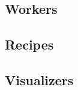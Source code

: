 \documentclass[a4paper]{article}
\begin{document}
\subsection{Workers}
\label{sec:data_processing_workers}

\subsection{Recipes}
\label{sec:data_processing_recipes}

\subsection{Visualizers}
\label{sec:data_processing_visualizers}




\clearpage

\printindex
\end{document}
